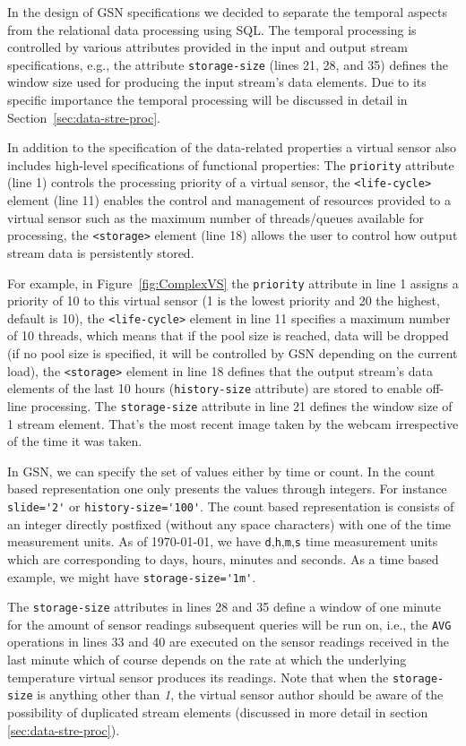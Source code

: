 In the design of GSN specifications we decided to separate the temporal aspects
from the relational data processing using SQL. The temporal processing is
controlled by various attributes provided in the input and output stream
specifications, e.g., the attribute \verb|storage-size| (lines 21, 28, and 35)
defines the window size used for producing the input stream's data elements.
Due to its specific importance the temporal processing will be discussed in
detail in Section~\ref{sec:data-stre-proc}.

In addition to the specification of the data-related properties a virtual
sensor also includes high-level specifications of functional properties: The
\verb|priority| attribute (line 1) controls the processing priority of a
virtual sensor, the \verb|<life-cycle>| element (line 11) enables the control
and management of resources provided to a virtual sensor such as the maximum
number of threads/queues available for processing, the \verb|<storage>| element
(line 18) allows the user to control how output stream data is persistently
stored.

For example, in Figure~\ref{fig:ComplexVS} the \verb|priority| attribute in
line 1 assigns a priority of 10 to this virtual sensor (1 is the lowest
priority and 20 the highest, default is 10), the \verb|<life-cycle>| element in
line 11 specifies a maximum number of 10 threads, which means that if the pool
size is reached, data will be dropped (if no pool size is specified, it will be
controlled by GSN depending on the current load), the \verb|<storage>| element
in line 18 defines that the output stream's data elements of the last 10 hours
(\verb|history-size| attribute) are stored to enable off-line processing.
The \verb|storage-size| attribute in line 21 defines the window size of 1 stream element. That's the most recent
image taken by the webcam irrespective of the time it was
taken.

In GSN, we can specify the set of values either by time or count. In the count based representation
one only presents the values through integers. For instance \verb|slide='2'| or \verb|history-size='100'|. The count based representation is consists of
an integer directly postfixed (without any space characters) with one of the time measurement units. As of \today, we have \texttt{d},\texttt{h},\texttt{m},\texttt{s} time measurement units which are corresponding to days, hours, minutes and seconds. As a time based example, we might have \verb|storage-size='1m'|.

The \verb|storage-size| attributes in lines 28 and 35 define a window of one minute for the amount of sensor readings subsequent queries
will be run on, i.e., the \verb|AVG| operations in lines 33 and 40 are executed
on the sensor readings received in the last minute which of course depends on
the rate at which the underlying temperature virtual sensor produces its
readings. Note that when the \verb|storage-size| is anything other than \emph{1}, the
virtual sensor author should be aware of the possibility of duplicated stream elements (discussed in more
detail in section \ref{sec:data-stre-proc}).

